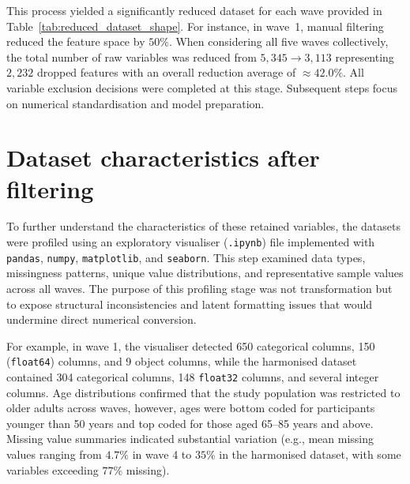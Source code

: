 This process yielded a significantly reduced dataset for each wave provided in Table~\ref{tab:reduced_dataset_shape}. For instance, in wave~1, manual filtering reduced the feature space by $50\%$. When considering all five waves collectively, the total number of raw variables was reduced from $5,345 \rightarrow 3,113$ representing $2,232$ dropped features with an overall reduction average of $\approx42.0\%$. All variable exclusion decisions were completed at this stage. Subsequent steps focus on numerical standardisation and model preparation.

\section{Dataset characteristics after filtering}
To further understand the characteristics of these retained variables, the datasets were profiled using an exploratory visualiser (\texttt{.ipynb}) file implemented with \texttt{pandas}, \texttt{numpy}, \texttt{matplotlib}, and \texttt{seaborn}. This step examined data types, missingness patterns, unique value distributions, and representative sample values across all waves. The purpose of this profiling stage was not transformation but to expose structural inconsistencies and latent formatting issues that would undermine direct numerical conversion.

\begin{table}[htbp]
\centering
\caption{Input shape for cleaning pipeline (post manual filtering workflow).}\label{tab:reduced_dataset_shape}
\end{table}

For example, in wave 1, the visualiser detected 650 categorical columns, 150 (\texttt{float64}) columns, and 9 object columns, while the harmonised dataset contained 304 categorical columns, 148 \texttt{float32} columns, and several integer columns. Age distributions confirmed that the study population was restricted to older adults across waves, however, ages were bottom coded for participants younger than 50 years and top coded for those aged 65--85 years and above. Missing value summaries indicated substantial variation (e.g., mean missing values ranging from $4.7\%$ in wave 4 to $35\%$ in the harmonised dataset, with some variables exceeding $77\%$ missing).

